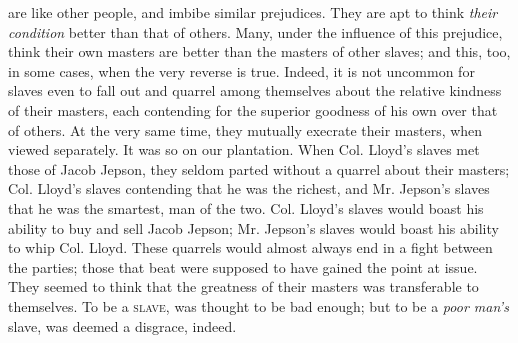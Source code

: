 are like other people, and imbibe similar prejudices. They are apt to
think \emph{their condition} better than that of others. Many, under the
influence of this prejudice, think their own masters are better than the
masters of other slaves; and this, too, in some cases, when the very
reverse is true. Indeed, it is not uncommon for slaves even to fall out
and quarrel among themselves about the relative kindness of their
masters, each contending for the superior goodness of his own over that
of others. At the very same time, they mutually execrate their masters,
when viewed separately. It was so on our plantation. When Col. Lloyd's
slaves met those of Jacob Jepson, they seldom parted without a quarrel
about their masters; Col. Lloyd's slaves contending that he was the
richest, and Mr. Jepson's slaves that he was the smartest, man of the
two. Col. Lloyd's slaves would boast his ability to buy and sell Jacob
Jepson; Mr. Jepson's slaves would boast his ability to whip Col. Lloyd.
These quarrels would almost always end in a fight between the parties;
those that beat were supposed to have gained the point at issue. They
seemed to think that the greatness of their masters was transferable to
themselves. To be a \textsc{slave}, was thought to be bad enough; but to
be a \emph{poor man's} slave, was deemed a disgrace, indeed.

